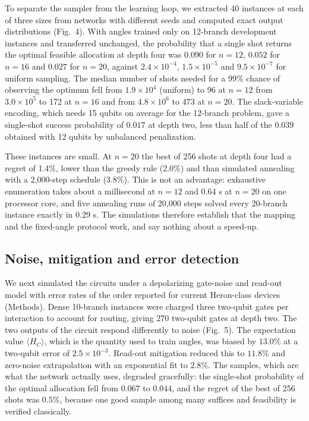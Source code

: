 To separate the sampler from the learning loop, we extracted 40 instances at each of three sizes from networks with different seeds and computed exact output distributions (Fig.~4). With angles trained only on 12-branch development instances and transferred unchanged, the probability that a single shot returns the optimal feasible allocation at depth four was $0.090$ for $n=12$, $0.052$ for $n=16$ and $0.027$ for $n=20$, against $2.4\times10^{-4}$, $1.5\times10^{-5}$ and $9.5\times10^{-7}$ for uniform sampling. The median number of shots needed for a 99\% chance of observing the optimum fell from $1.9\times10^{4}$ (uniform) to 96 at $n=12$ from $3.0\times10^{5}$ to 172 at $n=16$ and from $4.8\times10^{6}$ to 473 at $n=20$. The slack-variable encoding, which needs 15 qubits on average for the 12-branch problem, gave a single-shot success probability of $0.017$ at depth two, less than half of the $0.039$ obtained with 12 qubits by unbalanced penalization.

These instances are small. At $n=20$ the best of 256 shots at depth four had a regret of 1.4\%, lower than the greedy rule (2.0\%) and than simulated annealing with a 2,000-step schedule (3.8\%). This is not an advantage: exhaustive enumeration takes about a millisecond at $n=12$ and 0.64 s at $n=20$ on one processor core, and five annealing runs of 20,000 steps solved every 20-branch instance exactly in 0.29 s. The simulations therefore establish that the mapping and the fixed-angle protocol work, and say nothing about a speed-up.

\subsection*{Noise, mitigation and error detection}

We next simulated the circuits under a depolarizing gate-noise and read-out model with error rates of the order reported for current Heron-class devices\cite{ibm2026} (Methods). Dense 10-branch instances were charged three two-qubit gates per interaction to account for routing, giving 270 two-qubit gates at depth two. The two outputs of the circuit respond differently to noise (Fig.~5). The expectation value $\langle H_{C}\rangle$, which is the quantity used to train angles, was biased by $13.0$\% at a two-qubit error of $2.5\times10^{-3}$. Read-out mitigation\cite{vandenberg2022} reduced this to $11.8$\% and zero-noise extrapolation\cite{temme2017,li2017} with an exponential fit to $2.8$\%. The samples, which are what the network actually uses, degraded gracefully: the single-shot probability of the optimal allocation fell from $0.067$ to $0.044$, and the regret of the best of 256 shots was $0.5$\%, because one good sample among many suffices and feasibility is verified classically.

